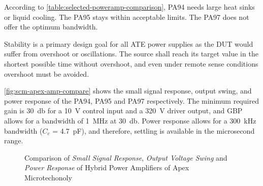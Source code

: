 According to \autoref{table:selected-poweramp-comparison}, PA94 needs large heat
sinks or liquid cooling.
The PA95 stays within acceptable limits.
The PA97 does not offer the optimum bandwidth.

\begin{table}[h!]
    \centering
    \footnotesize
    \caption{Power Supply Characteristics for Different Ranges.}
    \label{table:power_supply_characteristics}
\end{table}

Stability is a primary design goal for all \ac{ATE} power supplies
as the \ac{DUT} would suffer from overshoot or oscillations.
The source shall reach its target value in the shortest possible time
without overshoot, and even under remote sense conditions overshoot must
be avoided.

\autoref{fig:scm-apex-amp-compare} shows the small signal response,
output swing, and power response of the PA94, PA95 and PA97 respectively.
The minimum required gain is \SI{30}{\decibel} for a \SI{10}{\volt} control
input and a \SI{320}{\volt} driver output, and \ac{GBP} allows for a bandwidth
of \SI{1}{\mega\hertz} at \SI{30}{\decibel}.
Power response allows for a \SI{300}{\kilo\hertz} bandwidth
($C_c$ = \SI{4.7}{\pico\farad}), and therefore, settling is available in the
microsecond range.

\begin{figure}[htbp]
    \centering
    \caption[Apex PA94, PA95 and PA97 comparison]{Comparison of \emph{Small Signal
    Response}, \emph{Output Voltage Swing} and \emph{Power Response} of Hybrid
    Power Amplifiers
    of Apex Microtechonoly~\autocite{apex:pa94,apex:pa95,apex:pa97} }
    \label{fig:scm-apex-amp-compare}
\end{figure}

